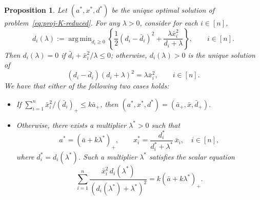 \documentclass[11pt]{article}
\DeclareMathOperator*{\argmin}{arg\,min}
\theoremstyle{plain}
\newtheorem{proposition}{Proposition}
\begin{document}
\begin{proposition}
\label{prop:appendix-proj-K}
Let $(a^*,x^*,d^*)$ be the unique optimal solution of problem~\eqref{eq:proj-K-reduced}.
For any $\lambda >0$, consider for each $i\in[n]$,
\begin{equation} \label{eq:d-lambda}
d_i(\lambda) := \argmin_{d_i\ge 0}\left\{
\frac12(d_i-\bar d_i)^2+\frac{\lambda\bar x_i^2}{d_i+\lambda}
\right\},\qquad i\in[n].
\end{equation}
Then $d_i(\lambda) = 0$ if 
$\bar d_i +{\bar x_i^2}/{\lambda}\leq 0$; otherwise, $d_i(\lambda)>0$ is the unique solution of
\begin{equation}
\label{eq:cubic-K}
(d_i-\bar d_i)(d_i+\lambda)^2=\lambda \bar x_i^2,
\qquad i\in[n].
\end{equation}
We have that either of the following two cases holds:
\begin{itemize}
\item[(i)] If $\sum_{i=1}^n \bar{x}_i^2/(\bar{d}_i)_+ \le k \bar{a}_+$, then
$
(a^*,x^*,d^*)=(\bar{a}_+,\bar{x},\bar{d}_+).
$


\item[(ii)] Otherwise, there exists a multiplier $\lambda^*>0$ such that
\[
a^*=(\bar a+k\lambda^*)_+,
\qquad
x_i^*=\frac{d_i^*}{d_i^*+\lambda^*}\,\bar x_i,\quad i\in[n],
\]
where $d_i^*=d_i(\lambda^*)$.
Such a multiplier $\lambda^*$ satisfies the scalar equation
\begin{equation}
\label{eq:root-K}
\sum_{i=1}^n
\frac{\bar x_i^2\, d_i(\lambda^*)}{(d_i(\lambda^*)+\lambda^*)^2}
=
k(\bar a+k\lambda^*)_+.
\end{equation}
\end{itemize}
\end{proposition}
\end{document}
